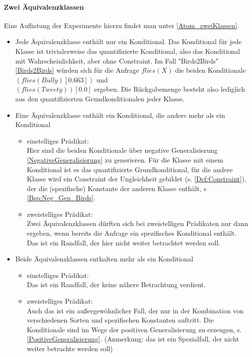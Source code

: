 \documentclass[a4paper, 11pt]{book}
\begin{document}
\paragraph{ Zwei Äquivalenzklassen}
Eine Auflistung der  Experimente hierzu findet man unter \ref{Atom_zweiKlassen}.
\begin{itemize}
\item Jede Äquivalenzklasse enthält nur ein Konditional. Das Konditional für jede Klasse ist trivialerweise das quantifizierte Konditional, also das Konditional mit Wahrscheinlichkeit, aber ohne Constraint. Im Fall "{}Birds2Birds"{} \ref{Birds2Birds} würden sich für die Anfrage $flies(X)$ die beiden Konditionale $ (flies(Bully)[0.663]) $ und \\ $ (flies(Tweety))[0.0] $ ergeben. Die Rückgabemenge besteht also lediglich aus den quantifizierten  Grundkonditionalen jeder Klasse.
\item Eine Äquivalenzklasse enthält ein Konditional, die andere mehr als ein Konditional
\begin{itemize}
	\item einstelliges Prädikat:\\
	Hier sind die beiden Konditionale über negative Generalisierung \ref{NegativeGeneralisierung} zu generieren. Für die Klasse mit einem Konditional ist es das quantifizierte Grundkonditional, für die andere Klasse wird ein Constraint der Ungleichheit gebildet (s. \ref{Def:Constraint}), der die (spezifische) Konstante der anderen Klasse enthält, s \ref{Bsp:Neg_Gen_Birds}. 
	\item zweistelliges Prädikat:\\
	Zwei Äquivalenzklassen dürften sich bei zweistelligen Prädikaten nur dann ergeben, wenn bereits die Anfrage ein spezifisches Konditional enthält. Das ist ein Randfall, der hier nicht weiter betrachtet werden soll. 
\end{itemize}
\item Beide Äquivalenzklassen enthalten mehr als ein Konditional
\begin{itemize}
	\item {einstelliges Prädikat:}\\
	Das ist ein Randfall, der keine nähere Betrachtung verdient.
	\item zweistelliges Prädikat:\\
	Auch das ist ein außergewöhnlicher Fall, der nur in der Kombination von verschiedenen Sorten und spezifischen Konstanten auftritt. Die Konditionale sind im Wege der positiven Generalisierung zu erzeugen, s. \ref{PositiveGeneralisierung}.
	(Anmerkung: das ist ein Spezialfall, der nicht weiter betrachte werden soll)
\end{itemize}
\end{itemize}
\end{document}
